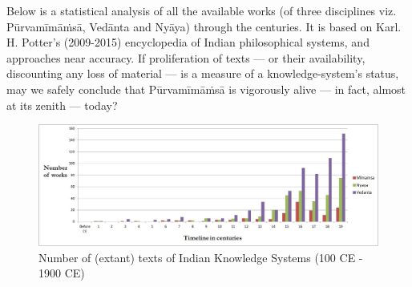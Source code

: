 Below is a statistical analysis of all the available works (of three disciplines viz. Pūrvamīmāṁsā, Vedānta and Nyāya) through the centuries. It is based on Karl. H. Potter’s (2009-2015) encyclopedia of Indian philosophical systems, and approaches near accuracy. If proliferation of texts — or their availability, discounting any loss of material — is a measure of a knowledge-system’s status, may we safely conclude that Pūrvamīmāṁsā is vigorously alive — in fact, almost at its zenith — today?   
\begin{figure}[H]
\centering
\includegraphics[scale=.88]{figures/fig1.jpg}
\caption{Number of (extant) texts of Indian Knowledge Systems (100 CE - 1900 CE)}\label{chap2-fig1}
\end{figure}

\vfill\eject

